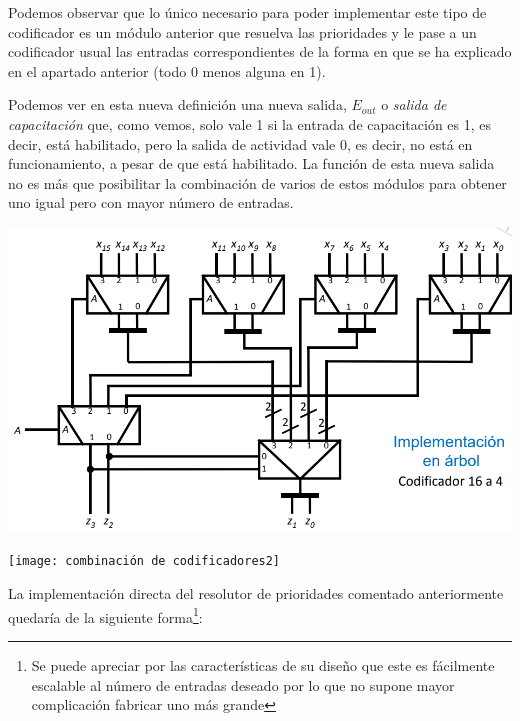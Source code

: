 \documentclass[a4paper,10pt]{book}
\begin{document}
Podemos observar que lo único necesario para poder implementar este tipo de codificador es un módulo anterior que resuelva las prioridades y le pase a un codificador usual las entradas correspondientes de la forma en que se ha explicado en el apartado anterior (todo 0 menos alguna en 1).\par

Podemos ver en esta nueva definición una nueva salida, $E_{out}$ o \textit{salida de capacitación} que, como vemos, solo vale 1 si la entrada de capacitación es 1, es decir, está habilitado, pero la salida de actividad vale 0, es decir, no está en funcionamiento, a pesar de que está habilitado. La función de esta nueva salida no es más que posibilitar la combinación de varios de estos módulos para obtener uno igual pero con mayor número de entradas.

\begin{center}
\includegraphics[scale=0.50]{combinacion de codificadores1}
\end{center}

\begin{center}
\texttt{[image: combinación de codificadores2]}
\end{center}

La implementación directa del resolutor de prioridades comentado anteriormente quedaría de la siguiente forma\footnote{Se puede apreciar por las características de su diseño que este es fácilmente escalable al número de entradas deseado por lo que no supone mayor complicación fabricar uno más grande}:
\end{document}
